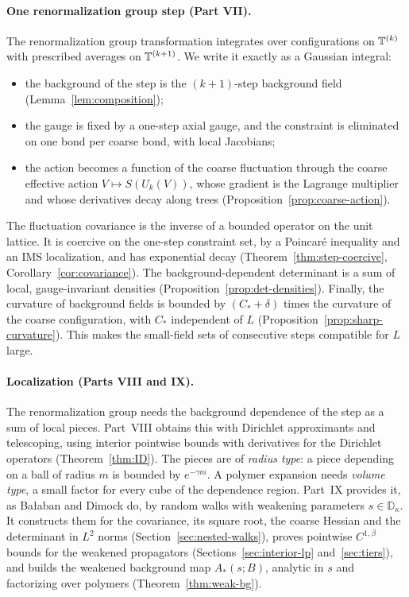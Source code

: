 \paragraph{One renormalization group step (Part VII).} The renormalization group transformation integrates over configurations on $\mathbb T^{(k)}$ with prescribed averages on $\mathbb T^{(k+1)}$. We write it exactly as a Gaussian integral:
\begin{itemize}
\item the background of the step is the $(k+1)$-step background field (Lemma~\ref{lem:composition});
\item the gauge is fixed by a one-step axial gauge, and the constraint is eliminated on one bond per coarse bond, with local Jacobians;
\item the action becomes a function of the coarse fluctuation through the coarse effective action $V\mapsto S(U_k(V))$, whose gradient is the Lagrange multiplier and whose derivatives decay along trees (Proposition~\ref{prop:coarse-action}).
\end{itemize}
The fluctuation covariance is the inverse of a bounded operator on the unit lattice. It is coercive on the one-step constraint set, by a Poincar\'e inequality and an IMS localization, and has exponential decay (Theorem~\ref{thm:step-coercive}, Corollary~\ref{cor:covariance}). The background-dependent determinant is a sum of local, gauge-invariant densities (Proposition~\ref{prop:det-densities}). Finally, the curvature of background fields is bounded by $(C_*+\delta)$ times the curvature of the coarse configuration, with $C_*$ independent of $L$ (Proposition~\ref{prop:sharp-curvature}). This makes the small-field sets of consecutive steps compatible for $L$ large.

\paragraph{Localization (Parts VIII and IX).} The renormalization group needs the background dependence of the step as a sum of local pieces. Part~VIII obtains this with Dirichlet approximants and telescoping, using interior pointwise bounds with derivatives for the Dirichlet operators (Theorem~\ref{thm:ID}). The pieces are of \emph{radius type}: a piece depending on a ball of radius $m$ is bounded by $e^{-\gamma m}$. A polymer expansion needs \emph{volume type}, a small factor for every cube of the dependence region. Part~IX provides it, as Ba\l aban and Dimock do, by random walks with weakening parameters $s\in\mathbb D_\kappa$. It constructs them for the covariance, its square root, the coarse Hessian and the determinant in $L^2$ norms (Section~\ref{sec:nested-walks}), proves pointwise $C^{1,\beta}$ bounds for the weakened propagators (Sections~\ref{sec:interior-lp} and~\ref{sec:tiers}), and builds the weakened background map $A_*(s;B)$, analytic in $s$ and factorizing over polymers (Theorem~\ref{thm:weak-bg}).

